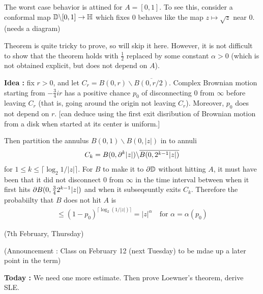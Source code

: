 \documentclass[12pt,a4paper]{article}
\newenvironment{proof}
{\begin{changemargin}{0.5cm}{0.5cm} 
	}%
	{\end{changemargin}
}
\newenvironment{p}
{\begin{proof} 
	}%
	{\end{proof}
}
\begin{document}
\begin{p}
The worst case behavior is attined for $A = [0,1]$. To see this, consider a conformal map $\mathbb{D} \backslash [0,1] \rightarrow \mathbb{H}$ which fixes 0 behaves like the map $z\mapsto \sqrt{z}$ near 0. (needs a diagram)
\s

Theorem is quite tricky to prove, so will skip it here. However, it is not difficult to show that the theorem holds with $\frac{1}{2}$ replaced by some constant $\alpha>0$ (which is not obtained explicit, but does not depend on $A$).
\s

\textbf{Idea :} fix $r>0$, and let $C_r = B(0, r) \backslash \overline{B(0, r/2)}$. Complex Brownian motion starting from $-\frac{3}{4}ir$ has a positive chance $p_0$ of disconnecting 0 from $\infty$ before leaving $C_r$ (that is, going around the origin not leaving $C_r$). Moreover, $p_0$ does not depend on $r$. [can deduce using the first exit disribution of Brownian motion from a disk when started at its center is uniform.]

\quad Then partition the annulus $B(0, 1) \backslash B(0, |z|)$ in to annuli
\begin{align*}
C_k = B(0, \partial^k |z|) \backslash \overline{B(0, 2^{k-1}|z|)}
\end{align*}
for $1\leq k \leq \lceil \log_2 1/|z| \rceil$. For $B$ to make it to $\partial \mathbb{D}$ without hitting $A$, it must have been that it did not disconnect 0 from $\infty$ in the time interval between when it first hits $\partial B(0, \frac{3}{4} 2^{k-1} |z|)$ and when it subseqeuntly exits $C_k$. Therefore the probabiilty that $B$ does not hit $A$ is
\begin{align*}
\leq (1-p_0)^{\lceil \log_2 (1/|z|) \rceil} = |z|^{\alpha} \quad \text{for } \alpha = \alpha(p_0)
\end{align*}
\end{p}
\s

\newday

(7th February, Thursday)
\s

(Announcement : Class on February 12 (next Tuesday) to be mdae up a later point in the term)
\s

\textbf{Today :} We need one more estimate. Then prove Loewner's theorem, derive SLE. 
\s
\end{document}
